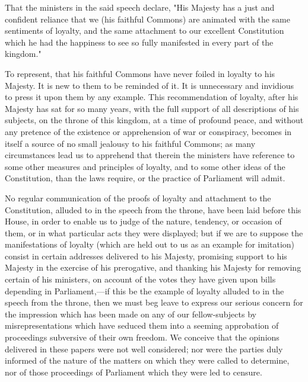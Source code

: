 That the ministers in the said speech declare, "His Majesty has a just and confident reliance that we (his faithful Commons) are animated with the same sentiments of loyalty, and the same attachment to our excellent Constitution which he had the happiness to see so fully manifested in every part of the kingdom."

To represent, that his faithful Commons have never foiled in loyalty to his Majesty. It is new to them to be reminded of it. It is unnecessary and invidious to press it upon them by any example. This recommendation of loyalty, after his Majesty has sat for so many years, with the full support of all descriptions of his subjects, on the throne of this kingdom, at a time of profound peace, and without any pretence of the existence or apprehension of war or conspiracy, becomes in itself a source of no small jealousy to his faithful Commons; as many circumstances lead us to apprehend that therein the ministers have reference to some other measures and principles of loyalty, and to some other ideas of the Constitution, than the laws require, or the practice of Parliament will admit.

No regular communication of the proofs of loyalty and attachment to the Constitution, alluded to in the speech from the throne, have been laid before this House, in order to enable us to judge of the nature, tendency, or occasion of them, or in what particular acts they were displayed; but if we are to suppose the manifestations of loyalty (which are held out to us as an example for imitation) consist in certain addresses delivered to his Majesty, promising support to his Majesty in the exercise of his prerogative, and thanking his Majesty for removing certain of his ministers, on account of the votes they have given upon bills depending in Parliament,—if this be the example of loyalty alluded to in the speech from the throne, then we must beg leave to express our serious concern for the impression which has been made on any of our fellow-subjects by misrepresentations which have seduced them into a seeming approbation of proceedings subversive of their own freedom. We conceive that the opinions delivered in these papers were not well considered; nor were the parties duly informed of the nature of the matters on which they were called to determine, nor of those proceedings of Parliament which they were led to censure.

